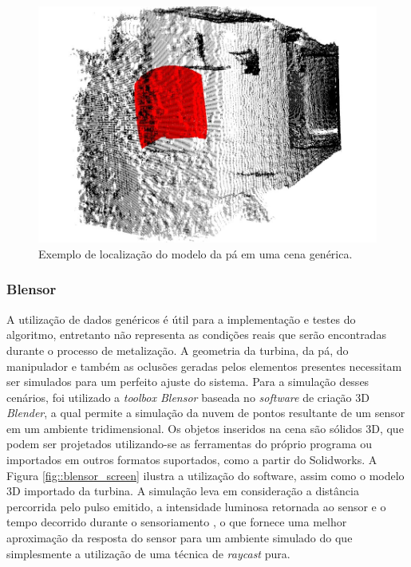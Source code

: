 \begin{figure}[h!]
	\centering
	\includegraphics[width=0.9\columnwidth]{method/figs/calibracao/blade_office5}
	\caption{Exemplo de localização do modelo da pá em uma cena genérica.}
    \label{fig::pa_cena_gen}
\end{figure}

\subsubsection{Blensor}

A utilização de dados genéricos é útil para a implementação e testes do
algoritmo, entretanto não representa as condições reais que serão encontradas
durante o processo de metalização. A geometria da turbina, da pá, do manipulador
e também as oclusões geradas pelos elementos presentes necessitam ser simulados
para um perfeito ajuste do sistema. Para a simulação desses cenários, foi
utilizado a \textit{toolbox Blensor}\footnotemark
{} baseada no \textit{software} de criação 3D
\textit{Blender}\footnotemark,  a qual
permite a simulação da nuvem de pontos resultante de um sensor em um ambiente
tridimensional. Os objetos inseridos na cena são sólidos 3D, que podem ser
projetados utilizando-se as ferramentas do próprio programa ou importados em outros formatos suportados, como a partir do
Solidworks\textregistered. A Figura \ref{fig::blensor_screen}
ilustra a utilização do software, assim como o modelo 3D importado da turbina.
A simulação leva em consideração a distância percorrida pelo pulso emitido, a
intensidade luminosa retornada ao sensor e o tempo decorrido durante o
sensoriamento \cite{Gschwandtner2011}, o que fornece uma melhor aproximação da
resposta do sensor para um ambiente simulado do que simplesmente a utilização de
uma técnica de \textit{raycast} pura.

